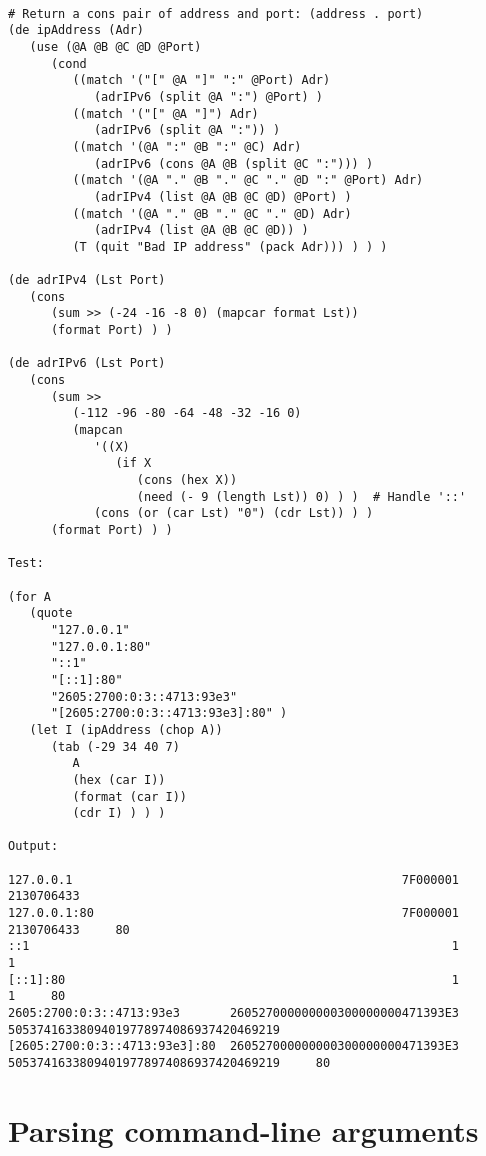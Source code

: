 \begin{verbatim}

# Return a cons pair of address and port: (address . port)
(de ipAddress (Adr)
   (use (@A @B @C @D @Port)
      (cond
         ((match '("[" @A "]" ":" @Port) Adr)
            (adrIPv6 (split @A ":") @Port) )
         ((match '("[" @A "]") Adr)
            (adrIPv6 (split @A ":")) )
         ((match '(@A ":" @B ":" @C) Adr)
            (adrIPv6 (cons @A @B (split @C ":"))) )
         ((match '(@A "." @B "." @C "." @D ":" @Port) Adr)
            (adrIPv4 (list @A @B @C @D) @Port) )
         ((match '(@A "." @B "." @C "." @D) Adr)
            (adrIPv4 (list @A @B @C @D)) )
         (T (quit "Bad IP address" (pack Adr))) ) ) )

(de adrIPv4 (Lst Port)
   (cons
      (sum >> (-24 -16 -8 0) (mapcar format Lst))
      (format Port) ) )

(de adrIPv6 (Lst Port)
   (cons
      (sum >>
         (-112 -96 -80 -64 -48 -32 -16 0)
         (mapcan
            '((X)
               (if X
                  (cons (hex X))
                  (need (- 9 (length Lst)) 0) ) )  # Handle '::'
            (cons (or (car Lst) "0") (cdr Lst)) ) )
      (format Port) ) )

Test:

(for A
   (quote
      "127.0.0.1"
      "127.0.0.1:80"
      "::1"
      "[::1]:80"
      "2605:2700:0:3::4713:93e3"
      "[2605:2700:0:3::4713:93e3]:80" )
   (let I (ipAddress (chop A))
      (tab (-29 34 40 7)
         A
         (hex (car I))
         (format (car I))
         (cdr I) ) ) )

Output:

127.0.0.1                                              7F000001                              2130706433
127.0.0.1:80                                           7F000001                              2130706433     80
::1                                                           1                                       1
[::1]:80                                                      1                                       1     80
2605:2700:0:3::4713:93e3       260527000000000300000000471393E3  50537416338094019778974086937420469219
[2605:2700:0:3::4713:93e3]:80  260527000000000300000000471393E3  50537416338094019778974086937420469219     80

\end{verbatim}

\section*{Parsing command-line arguments}

